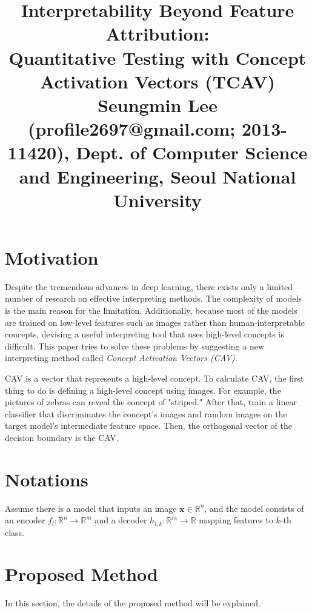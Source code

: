 \documentclass[10pt,twocolumn,letterpaper]{article}
\begin{document}
\title{Interpretability Beyond Feature Attribution: \\Quantitative Testing with Concept Activation Vectors (TCAV)
	 \\ {\rm {\normalsize Seungmin Lee (profile2697@gmail.com; 2013-11420), Dept. of Computer Science and Engineering, Seoul National University}}} 

\maketitle
\thispagestyle{empty}


\section{Motivation}
Despite the tremendous advances in deep learning, there exists only a limited number of research on effective interpreting methods. The complexity of models is the main reason for the limitation. Additionally, because most of the models are trained on low-level features such as images rather than human-interpretable concepts, devising a useful interpreting tool that uses high-level concepts is difficult. This paper tries to solve these problems by suggesting a new interpreting method called \textit{Concept Activation Vectors (CAV)}. 

CAV is a vector that represents a high-level concept. To calculate CAV, the first thing to do is defining a high-level concept using images. For example, the pictures of zebras can reveal the concept of "striped." After that, train a linear classifier that discriminates the concept's images and random images on the target model's intermediate feature space. Then, the orthogonal vector of the decision boundary is the CAV.

\section{Notations}
Assume there is a model that inputs an image $\mathbf{x} \in \mathbb{R}^n$, and the model consists of an encoder $f_l: \mathbb{R}^n \rightarrow \mathbb{R}^m$ and a decoder $h_{l, k}: \mathbb{R}^m \rightarrow \mathbb{R}$ mapping features to $k$-th class.

\section{Proposed Method}
In this section, the details of the proposed method will be explained.
\end{document}
